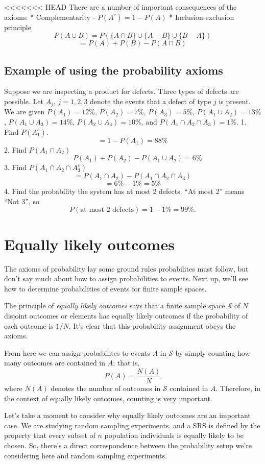 \documentclass[]{book}
\begin{document}
<<<<<<< HEAD
There are a number of important consequences of the axioms: *
Complementarity - \(P(A^c) = 1-P(A)\) * Inclusion-exclusion principle
\[P(A\cup B) = P(\{A\cap B\}\cup\{A-B\}\cup\{B-A\})\]
\[ = P(A)+P(B)-P(A\cap B)\]

\subsection{Example of using the probability
axioms}\label{example-of-using-the-probability-axioms}

Suppose we are inspecting a product for defects. Three types of defects
are possible. Let \(A_j\), \(j=1, 2, 3\) denote the events that a defect
of type \(j\) is present. We are given \(P(A_1) = 12\%\),
\(P(A_2) = 7\%\), \(P(A_3) = 5\%\), \(P(A_1\cup A_2) = 13\%\),
\(P(A_1 \cup A_3) = 14\%\), \(P(A_2 \cup A_3) = 10\%\), and
\(P(A_1\cap A_2\cap A_3) = 1\%\). 1. Find \(P(A_1^c)\).
\[ = 1-P(A_1) = 88\%\] 2. Find \(P(A_1\cap A_2)\)
\[ = P(A_1) + P(A_2) - P(A_1\cup A_2) = 6\%\] 3. Find
\(P(A_1 \cap A_2 \cap A_3^c)\)
\[ = P(A_1\cap A_2) - P(A_1\cap A_2 \cap A_3)\] \[ = 6\% - 1\% = 5\%\]
4. Find the probability the system has at most 2 defects. ``At most 2''
means ``Not 3'', so \[P(\text{at most 2 defects}) = 1 - 1\% = 99\%.\]

\section{Equally likely outcomes}\label{equally-likely-outcomes}

The axioms of probability lay some ground rules probabilites must
follow, but don't say much about how to assign probabilities to events.
Next up, we'll see how to determine probabilities of events for finite
sample spaces.

The principle of \emph{equally likely outcomes} says that a finite
sample space \(\mathcal{S}\) of \(N\) disjoint outcomes or elements has
equally likely outcomes if the probability of each outcome is \(1/N\).
It's clear that this probability assignment obeys the axioms.

From here we can assign probabilites to events \(A\) in \(\mathcal{S}\)
by simply counting how many outcomes are contained in \(A\); that is,
\[P(A) = \frac{N(A)}{N}\] where \(N(A)\) denotes the number of outcomes
in \(\mathcal{S}\) contained in \(A\). Therefore, in the context of
equally likely outcomes, counting is very important.

Let's take a moment to consider why equally likely outcomes are an
important case. We are studying random sampling experiments, and a SRS
is defined by the property that every subset of \(n\) population
individuals is equally likely to be chosen. So, there's a direct
correspondence between the probability setup we're considering here and
random sampling experiments.
\end{document}

